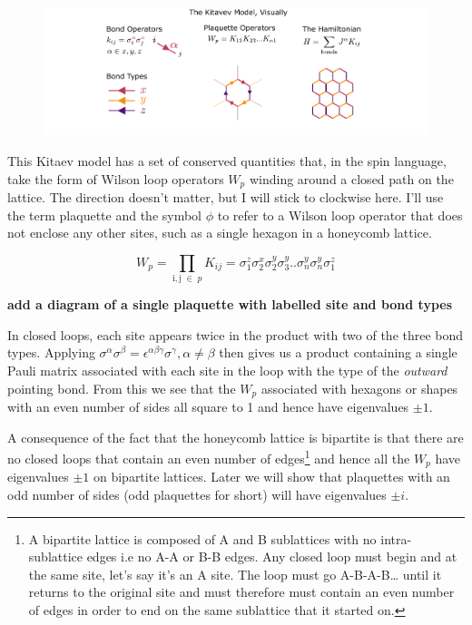 \begin{figure}
\hypertarget{fig:visual_kitaev_1}{%
\centering
\includegraphics[width=1\textwidth,height=\textheight]{figure_code/amk_chapter/visual_kitaev_1.pdf}
\caption{}\label{fig:visual_kitaev_1}
}
\end{figure}

This Kitaev model has a set of conserved quantities that, in the spin language, take the form of Wilson loop operators \(W_p\) winding around a closed path on the lattice. The direction doesn't matter, but I will stick to clockwise here. I'll use the term plaquette and the symbol \(\phi\) to refer to a Wilson loop operator that does not enclose any other sites, such as a single hexagon in a honeycomb lattice.

\[W_p = \prod_{\mathrm{i,j}\; \in\; p} K_{ij} = \sigma_1^z \sigma_2^x \sigma_2^y \sigma_3^y .. \sigma_n^y \sigma_n^y \sigma_1^z\]

\textbf{add a diagram of a single plaquette with labelled site and bond types}

In closed loops, each site appears twice in the product with two of the three bond types. Applying \(\sigma^\alpha \sigma^\beta = \epsilon^{\alpha \beta \gamma} \sigma^\gamma, \alpha \neq \beta\) then gives us a product containing a single Pauli matrix associated with each site in the loop with the type of the \emph{outward} pointing bond. From this we see that the \(W_p\) associated with hexagons or shapes with an even number of sides all square to 1 and hence have eigenvalues \(\pm 1\).

A consequence of the fact that the honeycomb lattice is bipartite is that there are no closed loops that contain an even number of edges\footnote{A bipartite lattice is composed of A and B sublattices with no intra-sublattice edges i.e no A-A or B-B edges. Any closed loop must begin and at the same site, let's say it's an A site. The loop must go A-B-A-B\ldots{} until it returns to the original site and must therefore must contain an even number of edges in order to end on the same sublattice that it started on.} and hence all the \(W_p\) have eigenvalues \(\pm 1\) on bipartite lattices. Later we will show that plaquettes with an odd number of sides (odd plaquettes for short) will have eigenvalues \(\pm i\).

